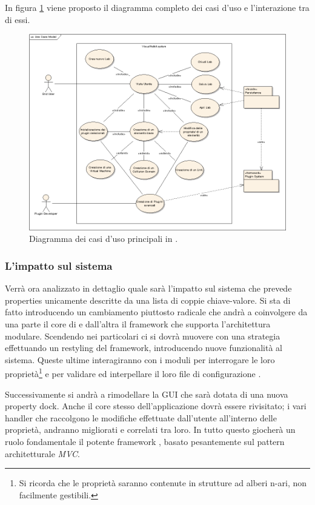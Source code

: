 In figura \ref{figura:uc1} viene proposto il diagramma completo dei casi d'uso e l'interazione tra di essi.

\begin{figure}[!htb]
	\centering
	\includegraphics[width=12cm]{images/UseCaseModel.png}
	\caption{Diagramma dei casi d'uso principali in \visualnetkit{}.}
	\label{figura:uc1}
\end{figure}

\subsubsection{L'impatto sul sistema}
Verrà ora analizzato in dettaglio quale sarà l'impatto sul sistema che prevede properties unicamente descritte da una lista di coppie chiave-valore. Si sta di fatto introducendo un cambiamento piuttosto radicale che andrà a coinvolgere da una parte il core di \visualnetkit{} e dall'altra il framework che supporta l'architettura modulare. Scendendo nei particolari ci si dovrà muovere con una strategia \bu{} effettuando un restyling del \plugin{} framework, introducendo nuove funzionalità al sistema. Queste ultime interagiranno con i moduli per interrogare le loro proprietà\footnote{Si ricorda che le proprietà saranno contenute in strutture ad alberi n-ari, non facilmente gestibili.} e per validare ed interpellare il loro file di configurazione \xml{}.

Successivamente si andrà a rimodellare la GUI che sarà dotata di una nuova property dock. Anche il core stesso dell'applicazione dovrà essere rivisitato; i vari handler che raccolgono le modifiche effettuate dall'utente all'interno delle proprietà, andranno migliorati e correlati tra loro. In tutto questo giocherà un ruolo fondamentale il potente framework \qt{}, basato pesantemente sul pattern architetturale \emph{MVC}\cite{QTDOCMVC}.

